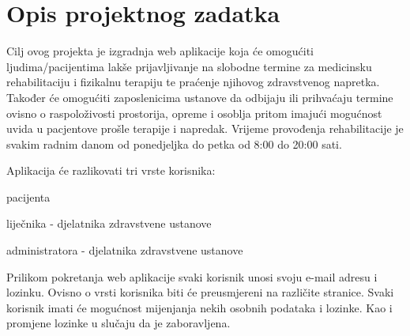 
\chapter{Opis projektnog zadatka}
		
		Cilj ovog projekta je izgradnja web aplikacije koja će omogućiti ljudima/pacijentima lakše prijavljivanje na slobodne termine za medicinsku rehabilitaciju i fizikalnu terapiju te praćenje njihovog zdravstvenog napretka. Također će omogućiti zaposlenicima ustanove da odbijaju ili prihvaćaju termine ovisno o raspoloživosti prostorija, opreme i osoblja pritom imajući mogućnost uvida u pacjentove prošle terapije i napredak. Vrijeme provođenja rehabilitacije je svakim radnim danom od ponedjeljka do petka od 8:00 do 20:00 sati.
		
		\noindent Aplikacija će razlikovati tri vrste korisnika: 
		\begin{packed_item}
			
			\item  pacijenta
			\item  liječnika - djelatnika zdravstvene ustanove
			\item  administratora - djelatnika zdravstvene ustanove
		\end{packed_item}
		
		Prilikom pokretanja web aplikacije svaki korisnik unosi svoju e-mail adresu i lozinku. Ovisno o vrsti korisnika biti će preusmjereni na različite stranice. Svaki korisnik imati će mogućnost mijenjanja nekih osobnih podataka i lozinke. Kao i promjene lozinke u slučaju da je zaboravljena.
		
